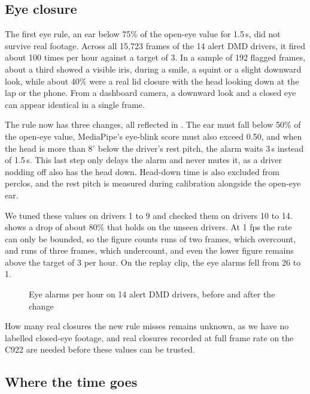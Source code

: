 \subsection{Eye closure}
\label{sec:eye-results}

The first eye rule, an \gls{ear} below 75\% of the open-eye value for 1.5\,s, did not survive real footage. Across all 15{,}723 frames of the 14 alert DMD drivers, it fired about 100 times per hour against a target of 3. In a sample of 192 flagged frames, about a third showed a visible iris, during a smile, a squint or a slight downward look, while about 40\% were a real lid closure with the head looking down at the lap or the phone. From a dashboard camera, a downward look and a closed eye can appear identical in a single frame.


The rule now has three changes, all reflected in . The \gls{ear} must fall below 50\% of the open-eye value, MediaPipe's eye-blink score must also exceed 0.50, and when the head is more than 8$^\circ$ below the driver's rest pitch, the alarm waits 3\,s instead of 1.5\,s. This last step only delays the alarm and never mutes it, as a driver nodding off also has the head down. Head-down time is also excluded from \gls{perclos}, and the rest pitch is measured during calibration alongside the open-eye \gls{ear}.

We tuned these values on drivers 1 to 9 and checked them on drivers 10 to 14.  shows a drop of about 80\% that holds on the unseen drivers. At 1 \gls{fps} the rate can only be bounded, so the figure counts runs of two frames, which overcount, and runs of three frames, which undercount, and even the lower figure remains above the target of 3 per hour. On the replay clip, the eye alarms fell from 26 to 1.

\begin{figure}[htbp]
\centering

\caption{Eye alarms per hour on 14 alert DMD drivers, before and after the change}
\label{fig:eye-rate}
\end{figure}

How many real closures the new rule misses remains unknown, as we have no labelled closed-eye footage, and real closures recorded at full frame rate on the C922 are needed before these values can be trusted.

\subsection{Where the time goes}

